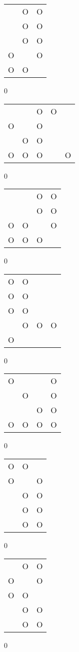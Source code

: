 \begin{tabular}{|m{0.2cm}m{0.2cm}m{0.2cm}|}\hline
 &O&O\\
 &O&O\\
 &O&O\\
O& &O\\
O&O& \\
\hline\end{tabular}0
\begin{tabular}{|m{0.2cm}m{0.2cm}m{0.2cm}m{0.2cm}m{0.2cm}|}\hline
 & &O&O& \\
O& &O& & \\
 &O&O& & \\
O&O&O& &O\\
\hline\end{tabular}0
\begin{tabular}{|m{0.2cm}m{0.2cm}m{0.2cm}m{0.2cm}|}\hline
 & &O&O\\
 & &O&O\\
O&O& &O\\
O&O&O& \\
\hline\end{tabular}0
\begin{tabular}{|m{0.2cm}m{0.2cm}m{0.2cm}m{0.2cm}|}\hline
O&O& & \\
O&O& & \\
O&O& & \\
 &O&O&O\\
O& & & \\
\hline\end{tabular}0
\begin{tabular}{|m{0.2cm}m{0.2cm}m{0.2cm}m{0.2cm}|}\hline
O& & &O\\
 &O& &O\\
 & &O&O\\
O&O&O&O\\
\hline\end{tabular}0
\begin{tabular}{|m{0.2cm}m{0.2cm}m{0.2cm}|}\hline
O&O& \\
O& &O\\
 &O&O\\
 &O&O\\
 &O&O\\
\hline\end{tabular}0
\begin{tabular}{|m{0.2cm}m{0.2cm}m{0.2cm}|}\hline
 &O&O\\
O& &O\\
O&O& \\
 &O&O\\
 &O&O\\
\hline\end{tabular}0
